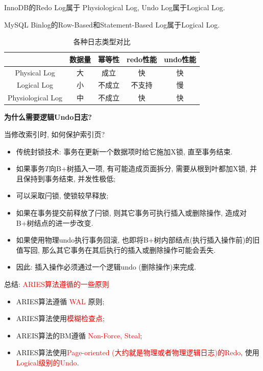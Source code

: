 InnoDB的Redo Log属于 Physiological Log, Undo Log属于Logical Log.

MySQL Binlog的Row-Based和Statement-Based Log属于Logical Log.

\begin{table}[H]
    \centering
    \begin{tabular}{|c|c|c|c|c|}
        \hline
         & \textbf{数据量} & \textbf{幂等性} & \textbf{redo性能} & \textbf{undo性能} \\ \hline
        Physical Log & 大 & 成立 & 快 & 快 \\ \hline
        Logical Log & 小 & 不成立 & 不支持 & 慢 \\ \hline
        Physiological Log & 中 & 不成立 & 快 & 快 \\ \hline
    \end{tabular}
    \caption{各种日志类型对比}
\end{table}

\textbf{为什么需要逻辑Undo日志?}

当修改索引时, 如何保护索引页?
\begin{itemize}
    \item 传统封锁技术: 事务在更新一个数据项时给它施加X锁, 直至事务结束.
    \item 如果事务$T$向B+树插入一项, 有可能造成页面拆分, 需要从根到叶都加X锁, 并且保持到事务结束, 并发性极低;
    \item 可以采取闩锁, 使锁较早释放;
    \item 如果在事务提交前释放了闩锁, 则其它事务可执行插入或删除操作, 造成对B+树结点的进一步改变.
    \item 如果使用物理undo执行事务回滚, 也即将B+树内部结点(执行插入操作前)的旧值写回, 那么其它事务在其后执行的插入或删除操作可能会丢失.
    \item 因此: 插入操作必须通过一个逻辑undo (删除操作)来完成.
\end{itemize}

总结: \textcolor{red}{ARIES算法遵循的一些原则}
\begin{itemize}
    \item ARIES算法遵循 \textcolor{red}{WAL} 原则;
    \item ARIES算法使用\textcolor{red}{模糊检查点};
    \item AREIS算法的BM遵循 \textcolor{red}{Non-Force, Steal};
    \item ARIES算法使用\textcolor{red}{Page-oriented (大约就是物理或者物理逻辑日志)的Redo}, 使用\textcolor{red}{Logical级别的Undo}.
\end{itemize}

